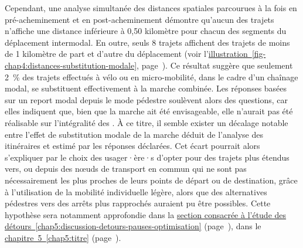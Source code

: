 \begin{refsegment}
Cependant, une analyse simultanée des distances spatiales parcourues à la fois en pré-acheminement et en post-acheminement démontre qu'aucun des trajets n'affiche une distance inférieure à 0,50 kilomètre pour chacun des segments du déplacement intermodal. En outre, seuls 8 trajets affichent des trajets de moins de 1 kilomètre de part et d'autre du déplacement (voir l'\hyperref[fig-chap4:distances-substitution-modale]{illustration~\ref{fig-chap4:distances-substitution-modale}}, page~\pageref{fig-chap4:distances-substitution-modale}). Ce résultat suggère que seulement 2~\% des trajets effectués à vélo ou en micro-mobilité, dans le cadre d'un chaînage modal, se substituent effectivement à la marche combinée. Les réponses basées sur un report modal depuis le mode pédestre soulèvent alors des questions, car elles indiquent que, bien que la marche ait été envisageable, elle n'aurait pas été réalisable sur l'intégralité des . À ce titre, il semble exister un décalage notable entre l'effet de substitution modale de la marche déduit de l'analyse des itinéraires et estimé par les réponses déclarées. Cet écart pourrait alors s'expliquer par le choix des usager·ère·s d'opter pour des trajets plus étendus vers, ou depuis des nœuds de transport en commun qui ne sont pas nécessairement les plus proches de leurs points de départ ou de destination, grâce à l'utilisation de la mobilité individuelle légère, alors que des alternatives pédestres vers des arrêts plus rapprochés auraient pu être possibles. Cette hypothèse sera notamment approfondie dans la \hyperref[chap5:discussion-detours-pauses-optimisation]{section consacrée à l'étude des détours~\ref{chap5:discussion-detours-pauses-optimisation}} (page~\pageref{chap5:discussion-detours-pauses-optimisation}), dans le \hyperref[chap5:titre]{chapitre~5~\ref{chap5:titre}} (page~\pageref{chap5:titre}).%


\end{refsegment}
